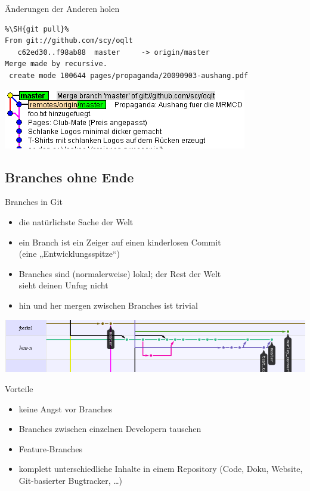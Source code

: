 \begin{frame}[fragile=singleslide]{Änderungen der Anderen holen}
\begin{example}
\begin{lstlisting}
%\SH{git pull}%
From git://github.com/scy/oqlt
   c62ed30..f98ab88  master     -> origin/master
Merge made by recursive.
 create mode 100644 pages/propaganda/20090903-aushang.pdf
\end{lstlisting}
\begin{center}\includegraphics[width=0.8\linewidth]{merge.png}\end{center}
\end{example}
\end{frame}

\subsection{Branches ohne Ende}

\begin{frame}{Branches in Git}
\begin{itemize}
	\item die natürlichste Sache der Welt
	\item ein Branch ist ein Zeiger auf einen kinderlosen Commit\\(eine „Entwicklungsspitze“)
	\item Branches sind (normalerweise) lokal; der Rest der Welt\\sieht deinen Unfug nicht
	\item hin und her mergen zwischen Branches ist trivial
\end{itemize}
\begin{center}\includegraphics[width=0.8\linewidth]{branches.png}\end{center}
\end{frame}

\begin{frame}{Vorteile}
\begin{itemize}
	\item keine Angst vor Branches
	\item Branches zwischen einzelnen Developern tauschen
	\item Feature-Branches
	\item komplett unterschiedliche Inhalte in einem Repository (Code, Doku, Website, Git-basierter Bugtracker, \ldots)
\end{itemize}
\end{frame}

